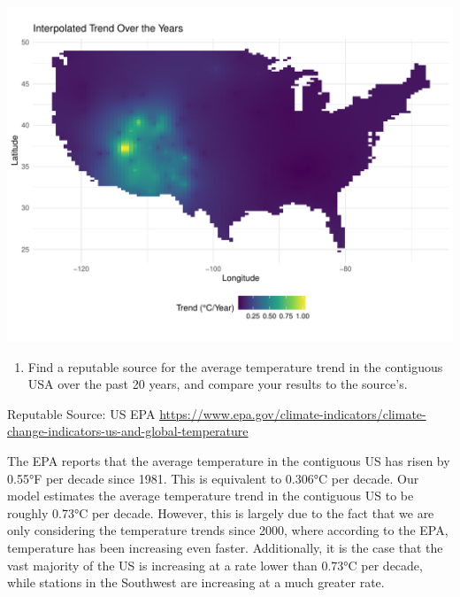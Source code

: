 \documentclass[
]{article}
\newenvironment{Shaded}{\begin{snugshade}}{\end{snugshade}}
\newcommand{\CommentTok}[1]{\textcolor[rgb]{0.56,0.35,0.01}{\textit{#1}}}
\newcommand{\DecValTok}[1]{\textcolor[rgb]{0.00,0.00,0.81}{#1}}
\newcommand{\FunctionTok}[1]{\textcolor[rgb]{0.13,0.29,0.53}{\textbf{#1}}}
\newcommand{\NormalTok}[1]{#1}
\newcommand{\SpecialCharTok}[1]{\textcolor[rgb]{0.81,0.36,0.00}{\textbf{#1}}}
\providecommand{\tightlist}{%
  \setlength{\itemsep}{0pt}\setlength{\parskip}{0pt}}
\begin{document}
\includegraphics{seesaw_files/figure-latex/unnamed-chunk-11-1.pdf}

\begin{enumerate}
\def\labelenumi{\arabic{enumi}.}
\setcounter{enumi}{5}
\tightlist
\item
  Find a reputable source for the average temperature trend in the
  contiguous USA over the past 20 years, and compare your results to the
  source's.
\end{enumerate}

Reputable Source: US EPA
\url{https://www.epa.gov/climate-indicators/climate-change-indicators-us-and-global-temperature}

\begin{Shaded}
\end{Shaded}

The EPA reports that the average temperature in the contiguous US has
risen by 0.55°F per decade since 1981. This is equivalent to 0.306°C per
decade. Our model estimates the average temperature trend in the
contiguous US to be roughly 0.73°C per decade. However, this is largely
due to the fact that we are only considering the temperature trends
since 2000, where according to the EPA, temperature has been increasing
even faster. Additionally, it is the case that the vast majority of the
US is increasing at a rate lower than 0.73°C per decade, while stations
in the Southwest are increasing at a much greater rate.
\end{document}
